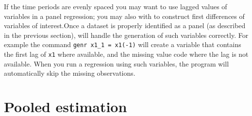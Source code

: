 If the time periods are evenly spaced you may want to use lagged
values of variables in a panel regression; you may also with to
construct first differences of variables of interest.Once a dataset is
properly identified as a panel (as described in the previous section),
 will handle the generation of such variables correctly.
For example the command \verb+genr x1_1 = x1(-1)+ will create a
variable that contains the first lag of \verb+x1+ where available, and
the missing value code where the lag is not available.  When you run a
regression using such variables, the program will automatically skip
the missing observations.

\section{Pooled estimation}
\label{pooled-est}

